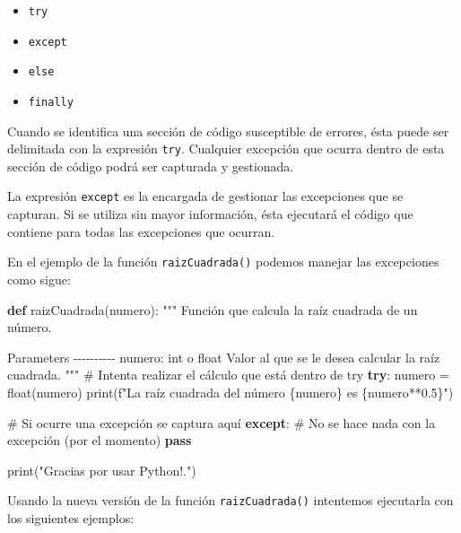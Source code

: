 \documentclass[
  spanish,
  letterpaper,
]{scrbook}
\newenvironment{Shaded}{\begin{snugshade}}{\end{snugshade}}
\newcommand{\BuiltInTok}[1]{\textcolor[rgb]{0.00,0.23,0.31}{#1}}
\newcommand{\CommentTok}[1]{\textcolor[rgb]{0.37,0.37,0.37}{#1}}
\newcommand{\ControlFlowTok}[1]{\textcolor[rgb]{0.00,0.23,0.31}{\textbf{#1}}}
\newcommand{\FloatTok}[1]{\textcolor[rgb]{0.68,0.00,0.00}{#1}}
\newcommand{\KeywordTok}[1]{\textcolor[rgb]{0.00,0.23,0.31}{\textbf{#1}}}
\newcommand{\NormalTok}[1]{\textcolor[rgb]{0.00,0.23,0.31}{#1}}
\newcommand{\OperatorTok}[1]{\textcolor[rgb]{0.37,0.37,0.37}{#1}}
\newcommand{\SpecialCharTok}[1]{\textcolor[rgb]{0.37,0.37,0.37}{#1}}
\newcommand{\SpecialStringTok}[1]{\textcolor[rgb]{0.13,0.47,0.30}{#1}}
\newcommand{\StringTok}[1]{\textcolor[rgb]{0.13,0.47,0.30}{#1}}
\providecommand{\tightlist}{%
  \setlength{\itemsep}{0pt}\setlength{\parskip}{0pt}}
\theoremstyle{definition}
\theoremstyle{remark}
\begin{document}
\begin{itemize}
\tightlist
\item
  \texttt{try}
\item
  \texttt{except}
\item
  \texttt{else}
\item
  \texttt{finally}
\end{itemize}

Cuando se identifica una sección de código susceptible de errores, ésta
puede ser delimitada con la expresión \texttt{try}. Cualquier excepción
que ocurra dentro de esta sección de código podrá ser capturada y
gestionada.

La expresión \texttt{except} es la encargada de gestionar las
excepciones que se capturan. Si se utiliza sin mayor información, ésta
ejecutará el código que contiene para todas las excepciones que ocurran.

En el ejemplo de la función \texttt{raizCuadrada()} podemos manejar las
excepciones como sigue:

\begin{Shaded}
\begin{Highlighting}[]
\KeywordTok{def}\NormalTok{ raizCuadrada(numero):}
    \CommentTok{"""}
\CommentTok{    Función que calcula la raíz cuadrada de un número.}

\CommentTok{    Parameters}
\CommentTok{    {-}{-}{-}{-}{-}{-}{-}{-}{-}{-}}
\CommentTok{    numero: int o float}
\CommentTok{        Valor al que se le desea calcular la raíz cuadrada.}
\CommentTok{    }
\CommentTok{    """}
    \CommentTok{\# Intenta realizar el cálculo que está dentro de try}
    \ControlFlowTok{try}\NormalTok{:}
\NormalTok{        numero }\OperatorTok{=} \BuiltInTok{float}\NormalTok{(numero)}
        \BuiltInTok{print}\NormalTok{(}\SpecialStringTok{f"La raíz cuadrada del número }\SpecialCharTok{\{}\NormalTok{numero}\SpecialCharTok{\}}\SpecialStringTok{ es }\SpecialCharTok{\{}\NormalTok{numero}\OperatorTok{**}\FloatTok{0.5}\SpecialCharTok{\}}\SpecialStringTok{"}\NormalTok{)}

    \CommentTok{\# Si ocurre una excepción se captura aquí}
    \ControlFlowTok{except}\NormalTok{:}
        \CommentTok{\# No se hace nada con la excepción (por el momento)}
        \ControlFlowTok{pass}

    \BuiltInTok{print}\NormalTok{(}\StringTok{"Gracias por usar Python!."}\NormalTok{)}
\end{Highlighting}
\end{Shaded}

Usando la nueva versión de la función \texttt{raizCuadrada()} intentemos
ejecutarla con los siguientes ejemplos:
\end{document}
